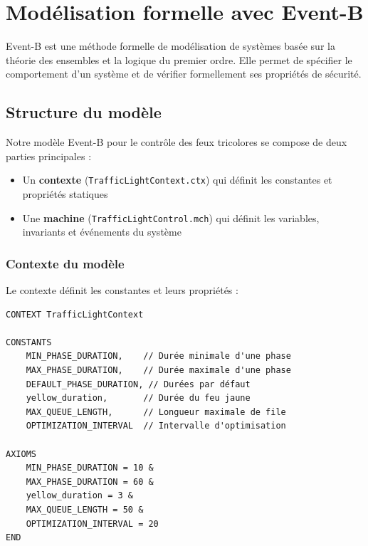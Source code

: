 \section{Modélisation formelle avec Event-B}
\label{sec:eventb}

Event-B est une méthode formelle de modélisation de systèmes basée sur la théorie des ensembles et la logique du premier ordre. Elle permet de spécifier le comportement d'un système et de vérifier formellement ses propriétés de sécurité.

\subsection{Structure du modèle}
\label{subsec:modele}

Notre modèle Event-B pour le contrôle des feux tricolores se compose de deux parties principales :
\begin{itemize}
    \item Un \textbf{contexte} (\texttt{TrafficLightContext.ctx}) qui définit les constantes et propriétés statiques
    \item Une \textbf{machine} (\texttt{TrafficLightControl.mch}) qui définit les variables, invariants et événements du système
\end{itemize}

\subsubsection{Contexte du modèle}
\label{subsubsec:contexte}

Le contexte définit les constantes et leurs propriétés :

\begin{lstlisting}[style=EventB, caption=Extrait du contexte Event-B]
CONTEXT TrafficLightContext

CONSTANTS
    MIN_PHASE_DURATION,    // Durée minimale d'une phase
    MAX_PHASE_DURATION,    // Durée maximale d'une phase
    DEFAULT_PHASE_DURATION, // Durées par défaut
    yellow_duration,       // Durée du feu jaune
    MAX_QUEUE_LENGTH,      // Longueur maximale de file
    OPTIMIZATION_INTERVAL  // Intervalle d'optimisation

AXIOMS
    MIN_PHASE_DURATION = 10 &
    MAX_PHASE_DURATION = 60 &
    yellow_duration = 3 &
    MAX_QUEUE_LENGTH = 50 &
    OPTIMIZATION_INTERVAL = 20
END
\end{lstlisting}
